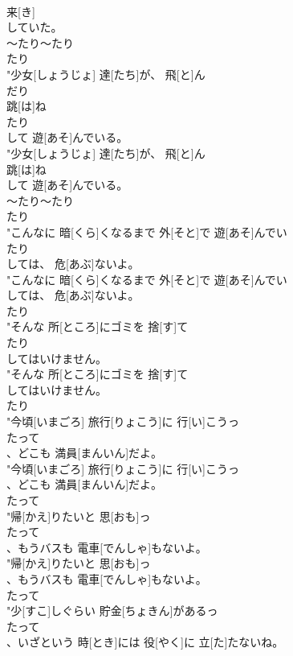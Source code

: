 \documentclass[8pt]{extreport}
\begin{document}
\begin{CJK}{UTF8}{min}
\\	来[き]
\\	していた。
\\	～たり～たり 
\\	たり
\\	"少女[しょうじょ] 達[たち]が、 飛[と]ん
\\	だり
\\	跳[は]ね
\\	たり
\\	して 遊[あそ]んでいる。
\\	"少女[しょうじょ] 達[たち]が、 飛[と]ん
\\	跳[は]ね
\\	して 遊[あそ]んでいる。
\\	～たり～たり 
\\	たり
\\	"こんなに 暗[くら]くなるまで 外[そと]で 遊[あそ]んでい
\\	たり
\\	しては、 危[あぶ]ないよ。
\\	"こんなに 暗[くら]くなるまで 外[そと]で 遊[あそ]んでい
\\	しては、 危[あぶ]ないよ。
\\	たり
\\	"そんな 所[ところ]にゴミを 捨[す]て
\\	たり
\\	してはいけません。
\\	"そんな 所[ところ]にゴミを 捨[す]て
\\	してはいけません。
\\	たり
\\	"今頃[いまごろ] 旅行[りょこう]に 行[い]こうっ
\\	たって
\\	、どこも 満員[まんいん]だよ。
\\	"今頃[いまごろ] 旅行[りょこう]に 行[い]こうっ
\\	、どこも 満員[まんいん]だよ。
\\	たって
\\	"帰[かえ]りたいと 思[おも]っ
\\	たって
\\	、もうバスも 電車[でんしゃ]もないよ。
\\	"帰[かえ]りたいと 思[おも]っ
\\	、もうバスも 電車[でんしゃ]もないよ。
\\	たって
\\	"少[すこ]しぐらい 貯金[ちょきん]があるっ
\\	たって
\\	、いざという 時[とき]には 役[やく]に 立[た]たないね。

\end{CJK}
\end{document}
